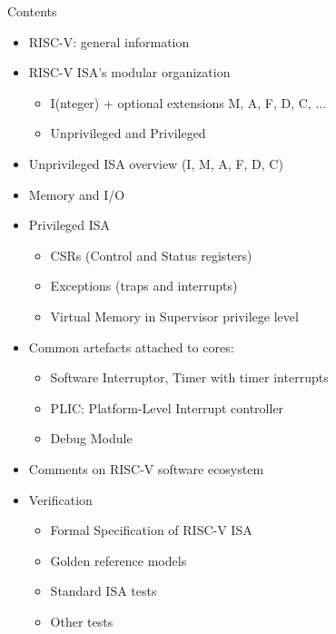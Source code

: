 \documentclass{article}
\begin{document}
\begin{center}
  {\Huge Contents}

  \vspace{0.2in}

  \begin{minipage}{6in}\Large
    \begin{itemize}

    \item RISC-V: general information

    \item RISC-V ISA's modular organization
      \begin{itemize}
      \item I(nteger) + optional extensions M, A, F, D, C, ...
      \item Unprivileged and Privileged
      \end{itemize}

    \item Unprivileged ISA overview (I, M, A, F, D, C)

    \item Memory and I/O

    \item Privileged ISA
      \begin{itemize}
      \item CSRs (Control and Status registers)
      \item Exceptions (traps and interrupts)
      \item Virtual Memory in Supervisor privilege level
      \end{itemize}

    \item Common artefacts attached to cores:
      \begin{itemize}
      \item Software Interruptor, Timer with timer interrupts
      \item PLIC: Platform-Level Interrupt controller
      \item Debug Module
      \end{itemize}

    \item Comments on RISC-V software ecosystem

    \item Verification
      \begin{itemize}
      \item Formal Specification of RISC-V ISA
      \item Golden reference models
      \item Standard ISA tests
      \item Other tests
      \end{itemize}
    \end{itemize}
  \end{minipage}
\end{center}
\end{document}

